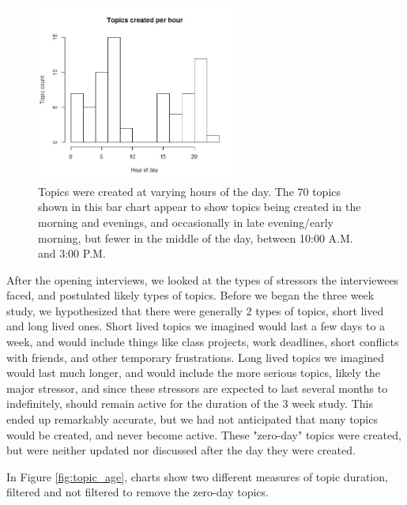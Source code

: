     \begin{figure}
    \centering
    \includegraphics[width=0.6\textwidth]{topics_per_hour.jpg}
    \caption[Topics Created by Hour of Day]{
      Topics were created at varying hours of the day.
      The 70 topics shown in this bar chart appear to show
      topics being created in the morning and evenings,
      and occasionally in late evening/early morning,
      but fewer in the middle of the day, between 10:00 A.M. and 3:00 P.M.
    }
    \label{fig:topic_hours}
    \end{figure}

    After the opening interviews, we looked at the types of stressors the
    interviewees faced, and postulated likely types of topics.
    Before we began the three week study,
    we hypothesized that there were generally 2 types of topics,
    short lived and long lived ones.
    Short lived topics we imagined would last a few days to a week,
    and would include things like class projects,
    work deadlines, short conflicts with friends, and other temporary frustrations.
    Long lived topics we imagined would last much longer,
    and would include the more serious topics, likely the major stressor,
    and since these stressors are expected to last several months to indefinitely,
    should remain active for the duration of the 3 week study.
    This ended up remarkably accurate,
    but we had not anticipated that many topics would be created,
    and never become active.
    These "zero-day" topics were created,
    but were neither updated nor discussed after the day they were created.

    In Figure \ref{fig:topic_age}, charts show two different measures of 
    topic duration, filtered and not filtered to remove the zero-day topics.

